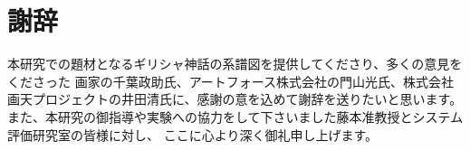 \section*{謝辞}
本研究での題材となるギリシャ神話の系譜図を提供してくださり、多くの意見をくださった
画家の千葉政助氏、アートフォース株式会社の門山光氏、株式会社画天プロジェクトの井田清氏に、感謝の意を込めて謝辞を送りたいと思います。
また、本研究の御指導や実験への協力をして下さいました藤本准教授とシステム評価研究室の皆様に対し、
ここに心より深く御礼申し上げます。
